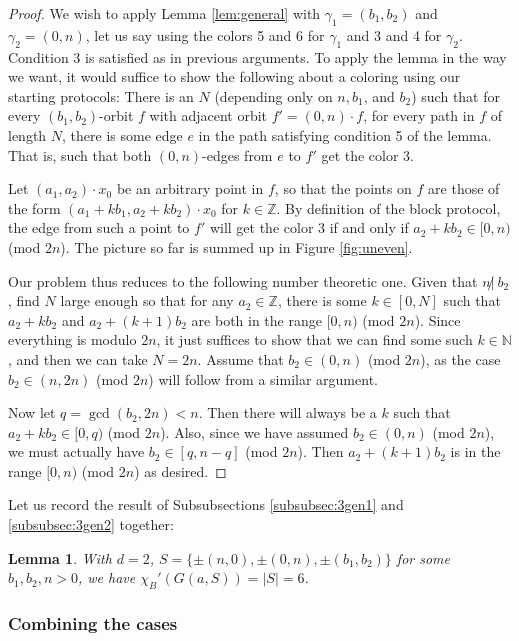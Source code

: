 \documentclass[12pt]{article}
\newcommand{\0}{\varnothing}
\newcommand{\Z}{\mathbb{Z}}
\newcommand{\N}{\mathbb{N}}
\newtheorem{lemma}{Lemma}
\begin{document}
\begin{proof}
We wish to apply Lemma \ref{lem:general} with $\gamma_1 = (b_1,b_2)$ and $\gamma_2 = (0,n)$, let us say using the colors 5 and 6 for $\gamma_1$ and 3 and 4 for $\gamma_2$. Condition 3 is satisfied as in previous arguments. To apply the lemma in the way we want, it would suffice to show the following about a coloring using our starting protocols: There is an $N$ (depending only on $n,b_1$, and $b_2$) such that for every $(b_1,b_2)$-orbit $f$ with adjacent orbit $f' = (0,n) \cdot f$, for every path in $f$ of length $N$, there is some edge $e$ in the path satisfying condition 5 of the lemma. That is, such that both $(0,n)$-edges from $e$ to $f'$ get the color 3.

Let $(a_1,a_2) \cdot x_0$ be an arbitrary point in $f$, so that the points on $f$ are those of the form $(a_1 + kb_1,a_2+kb_2) \cdot x_0$ for $k \in \Z$. By definition of the block protocol, the edge from such a point to $f'$ will get the color 3 if and only if $a_2 + kb_2 \in [0,n)$ (mod $2n$). The picture so far is summed up in Figure \ref{fig:uneven}.

Our problem thus reduces to the following number theoretic one. Given that $n \not|\ b_2$, find $N$ large enough so that for any $a_2 \in \Z$, there is some $k \in [0,N]$ such that $a_2+kb_2$ and $a_2 + (k+1)b_2$ are both in the range $[0,n)$ (mod $2n$). Since everything is modulo $2n$, it just suffices to show that we can find some such $k \in \N$, and then we can take $N = 2n$. Assume that $b_2 \in (0,n)$ (mod $2n$), as the case $b_2 \in (n,2n)$ (mod $2n$) will follow from a similar argument.

Now let $q = \gcd(b_2,2n) < n$. Then there will always be a $k$ such that $a_2 + kb_2 \in [0,q)$ (mod $2n$). Also, since we have assumed $b_2 \in (0,n)$ (mod $2n$), we must actually have $b_2 \in [q,n-q]$ (mod $2n$). Then $a_2+(k+1)b_2$ is in the range $[0,n)$ (mod $2n$) as desired.
\end{proof}

Let us record the result of Subsubsections \ref{subsubsec:3gen1} and \ref{subsubsec:3gen2} together:

\begin{lemma}\label{lem:3gens}
With $d = 2$, $S = \{\pm(n,0),\pm(0,n),\pm(b_1,b_2)\}$ for some $b_1,b_2,n > 0$, we have $\chi_B'(G(a,S)) = |S| = 6$.
\end{lemma}

\subsubsection{Combining the cases}\label{subsubsec:2comb}
\end{document}
